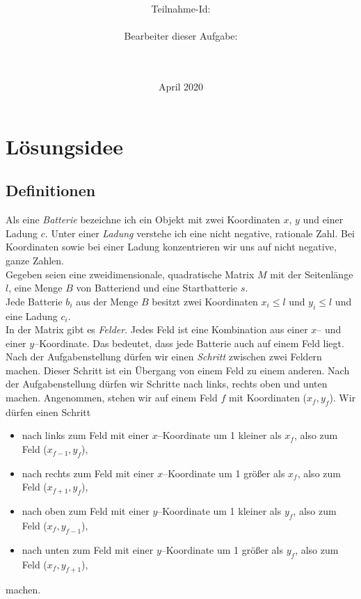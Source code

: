 \documentclass[a4paper,10pt,ngerman]{scrartcl}
\title{\textbf{\Huge\Aufgabe}}
\author{\LARGE Teilnahme-Id: \LARGE \TeilnahmeId \\\\
	    \LARGE Bearbeiter dieser Aufgabe: \\ 
	    \LARGE \Namen\\\\}
\date{\LARGE April 2020}
\begin{document}
\maketitle
\tableofcontents

\vspace{0.5cm}

\newpage
\section{Lösungsidee}
\subsection{Definitionen}\label{sec:definitions}

Als eine \textit{Batterie} bezeichne ich ein Objekt mit zwei Koordinaten $x$, $y$ und einer Ladung $c$.
Unter einer \textit{Ladung} verstehe ich eine nicht negative, rationale Zahl.
Bei Koordinaten sowie bei einer Ladung konzentrieren wir uns auf nicht negative, ganze Zahlen.\\

Gegeben seien eine zweidimensionale, quadratische Matrix $M$ mit der Seitenlänge $l$, eine Menge $B$ von Batteriend
und eine Startbatterie $s$.\\
Jede Batterie $b_i$ aus der Menge $B$ besitzt zwei Koordinaten $x_i \leqslant l$ und $y_i \leqslant l$ und eine Ladung $c_i$.\\
In der Matrix gibt es \textit{Felder}. Jedes Feld ist eine Kombination aus einer $x$-- und einer $y$--Koordinate.
Das bedeutet, dass jede Batterie auch auf einem Feld liegt.\\

Nach der Aufgabenstellung dürfen wir einen \textit{Schritt} zwischen zwei Feldern machen. Dieser Schritt ist 
ein Übergang von einem Feld zu einem anderen. Nach der Aufgabenstellung dürfen wir Schritte nach links, rechts oben und unten machen.
Angenommen, stehen wir auf einem Feld $f$ mit Koordinaten ($x_f,y_f$). Wir dürfen einen Schritt
\begin{itemize}
\item nach links zum Feld mit einer $x$--Koordinate um 1 kleiner als $x_f$, also zum Feld ($x_{f-1},y_f$),
\item nach rechts zum Feld mit einer $x$--Koordinate um 1 größer als $x_f$, also zum Feld ($x_{f+1},y_f$),
\item nach oben zum Feld mit einer $y$--Koordinate um 1 kleiner als $y_f$, also zum Feld ($x_f,y_{f-1}$),
\item nach unten zum Feld mit einer $y$--Koordinate um 1 größer als $y_f$, also zum Feld ($x_f,y_{f+1}$),
\end{itemize}
machen.
\end{document}
